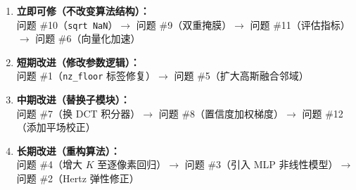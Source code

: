 \documentclass[12pt, a4paper]{ctexart}
\begin{document}
\begin{enumerate}
  \item \textbf{立即可修（不改变算法结构）：}\\
        问题 \#10（\texttt{sqrt NaN}）$\to$
        问题 \#9（双重掩膜）$\to$
        问题 \#11（评估指标）$\to$
        问题 \#6（向量化加速）

  \item \textbf{短期改进（修改参数逻辑）：}\\
        问题 \#1（\texttt{nz\_floor} 标签修复）$\to$
        问题 \#5（扩大高斯融合邻域）

  \item \textbf{中期改进（替换子模块）：}\\
        问题 \#7（换 DCT 积分器）$\to$
        问题 \#8（置信度加权梯度）$\to$
        问题 \#12（添加平场校正）

  \item \textbf{长期改进（重构算法）：}\\
        问题 \#4（增大 $K$ 至逐像素回归）$\to$
        问题 \#3（引入 MLP 非线性模型）$\to$
        问题 \#2（Hertz 弹性修正）
\end{enumerate}

\newpage


\end{document}
